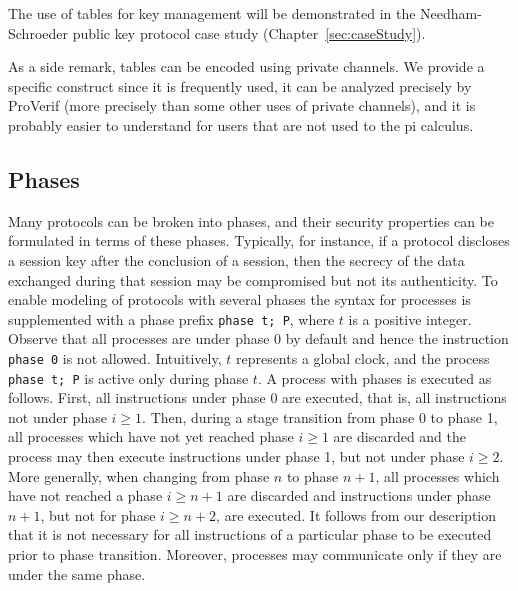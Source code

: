 \documentclass{book}
\begin{document}
The use of tables for key management will be demonstrated in the Needham-Schroeder public key protocol case study (Chapter~\ref{sec:caseStudy}).



As a side remark, tables can be encoded using private channels. We provide a specific construct since it is frequently used, it can be analyzed precisely by ProVerif (more precisely than some other uses of private channels), and it is probably easier to understand for users that are not used to the pi calculus.

\subsection{Phases}\label{sec:phases}

Many protocols can be broken into phases, and their security properties can be formulated in terms of these phases. Typically, for instance, if a protocol discloses a session key after the conclusion of a session, then the secrecy of the data exchanged during that session may be compromised but not its authenticity. To enable modeling of protocols with several phases the syntax for processes is supplemented with a phase prefix \lstinline!phase t; P!, where $t$ is a positive integer. Observe that all processes are under phase 0 by default and hence the instruction \lstinline!phase 0! is not allowed.
Intuitively, $t$ represents a global clock, and the process \lstinline!phase t; P! is active only during phase $t$.
%
A process with phases is executed as follows. First, all instructions under phase 0 are executed, that is, all instructions not under phase $i \geq 1$. Then, during a stage transition from phase 0 to phase 1, all processes which have not yet reached phase $i \geq 1$ are discarded and the process may then execute instructions under phase 1, but not under phase $i \geq 2$. More generally, when changing from phase $n$ to phase $n+1$, all processes which have not reached a phase $i \geq n+1$ are discarded and instructions under phase $n+1$, but not for phase $i \geq n+2$, are executed. It follows from our description that it is not necessary for all instructions of a particular phase to be executed prior to phase transition. Moreover, processes may communicate only if they are under the same phase.
\end{document}
